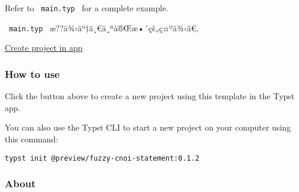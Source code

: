 \begin{Shaded}
\begin{Highlighting}[]

\NormalTok{)}





\end{Highlighting}
\end{Shaded}

Refer to \texttt{\ main.typ\ } for a complete example.

\texttt{\ main.typ\ } æ??ä¾›äº†ä¸€ä¸ªå®Œæ•´çš„ç¤ºä¾‹ã€‚

\href{/app?template=fuzzy-cnoi-statement&version=0.1.2}{Create project
in app}

\subsubsection{How to use}\label{how-to-use}

Click the button above to create a new project using this template in
the Typst app.

You can also use the Typst CLI to start a new project on your computer
using this command:

\begin{verbatim}
typst init @preview/fuzzy-cnoi-statement:0.1.2
\end{verbatim}



\subsubsection{About}\label{about}

